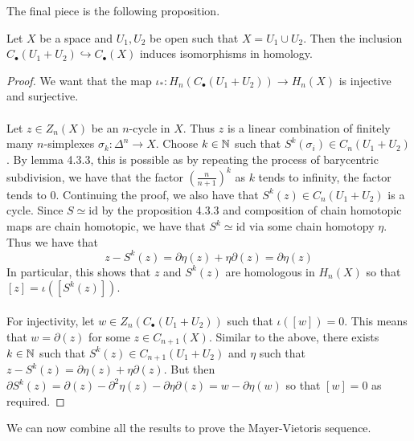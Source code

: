 \documentclass[a4paper]{article}
\begin{document}
The final piece is the following proposition. 

\begin{prp}{}{} Let $X$ be a space and $U_1,U_2$ be open such that $X=U_1\cup U_2$. Then the inclusion $C_\bullet(U_1+U_2)\hookrightarrow C_\bullet(X)$ induces isomorphisms in homology. \tcbline
\begin{proof}
We want that the map $\iota_\ast:H_n(C_\bullet(U_1+U_2))\to H_n(X)$ is injective and surjective. \\~\\

Let $z\in Z_n(X)$ be an $n$-cycle in $X$. Thus $z$ is a linear combination of finitely many $n$-simplexes $\sigma_k:\Delta^n\to X$. Choose $k\in\mathbb{N}$ such that $S^k(\sigma_i)\in C_n(U_1+U_2)$. By lemma 4.3.3, this is possible as by repeating the process of barycentric subdivision, we have that the factor $\left(\frac{n}{n+1}\right)^k$ as $k$ tends to infinity, the factor tends to $0$. Continuing the proof, we also have that $S^k(z)\in C_n(U_1+U_2)$ is a cycle. Since $S\simeq\text{id}$ by the proposition 4.3.3 and composition of chain homotopic maps are chain homotopic, we have that $S^k\simeq\text{id}$ via some chain homotopy $\eta$. Thus we have that $$z-S^k(z)=\partial\eta(z)+\eta\partial(z)=\partial\eta(z)$$ In particular, this shows that $z$ and $S^k(z)$ are homologous in $H_n(X)$ so that $[z]=\iota([S^k(z)])$. \\~\\

For injectivity, let $w\in Z_n(C_\bullet(U_1+U_2))$ such that $\iota([w])=0$. This means that $w=\partial(z)$ for some $z\in C_{n+1}(X)$. Similar to the above, there exists $k\in\mathbb{N}$ such that $S^k(z)\in C_{n+1}(U_1+U_2)$ and $\eta$ such that $z-S^k(z)=\partial\eta(z)+\eta\partial(z)$. But then $\partial S^k(z)=\partial(z)-\partial^2\eta(z)-\partial\eta\partial(z)=w-\partial\eta(w)$ so that $[w]=0$ as required. 
\end{proof}
\end{prp}

We can now combine all the results to prove the Mayer-Vietoris sequence. 
\end{document}
